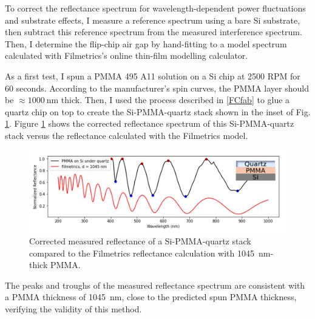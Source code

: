 \documentclass[double,12pt,1in]{beavtex}
\begin{document}
To correct the reflectance spectrum for wavelength-dependent power fluctuations and substrate effects, I measure a reference spectrum using a bare Si substrate, then subtract this reference spectrum from the measured interference spectrum. Then, I determine the flip-chip air gap by hand-fitting to a model spectrum calculated with Filmetrics’s online thin-film modelling calculator. 

As a first test, I spun a PMMA 495 A11 solution on a Si chip at 2500 RPM for 60 seconds. According to the manufacturer's spin curves, the PMMA layer should be $\approx \SI{1000}{\nano\meter}$ thick. Then, I used the process described in \ref{FCfab} to glue a quartz chip on top to create the Si-PMMA-quartz stack shown in the inset of Fig. \ref{PMMAqzspec}. Figure \ref{PMMAqzspec} shows the corrected reflectance spectrum of this Si-PMMA-quartz stack versus the reflectance calculated with the Filmetrics model.


\begin{figure}
    \includegraphics[width=1\textwidth]{qzPMMAsi stack spec.PNG}
    \caption{Corrected measured reflectance of a Si-PMMA-quartz stack compared to the Filmetrics reflectance calculation with \SI{1045}{\nano\meter}-thick PMMA.}
    \label{PMMAqzspec}
\end{figure}

The peaks and troughs of the measured reflectance spectrum are consistent with a PMMA thickness of \SI{1045}{\nano\meter}, close to the predicted spun PMMA thickness, verifying the validity of this method.
\end{document}
